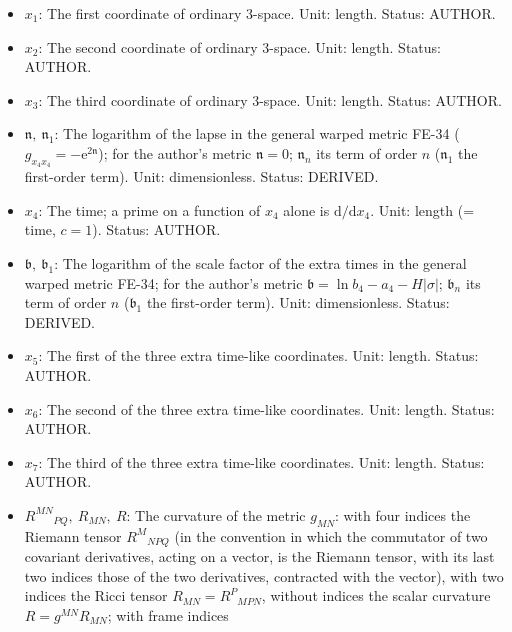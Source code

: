 \documentclass[
  10pt,
]{article}
\begin{document}
\begin{itemize}
  of ordinary space in the general warped metric FE-34, a function of
  \(\sigma\) and \(x_4\); for the author's metric
  \(\mathfrak{a} = a_4 - H\lvert\sigma\rvert\); \(\mathfrak{a}_n\) its
  term of order \(n\) in the power series FE-35 (\(\mathfrak{a}_1\) the
  first-order term). Unit: dimensionless. Status: DERIVED.
\item
  \(x_1\): The first coordinate of ordinary 3-space. Unit: length.
  Status: AUTHOR.
\item
  \(x_2\): The second coordinate of ordinary 3-space. Unit: length.
  Status: AUTHOR.
\item
  \(x_3\): The third coordinate of ordinary 3-space. Unit: length.
  Status: AUTHOR.
\item
  \(\mathfrak{n},\ \mathfrak{n}_1\): The logarithm of the lapse in the
  general warped metric FE-34
  (\(g_{x_4x_4} = -\mathrm{e}^{2\mathfrak{n}}\)); for the author's
  metric \(\mathfrak{n} = 0\); \(\mathfrak{n}_n\) its term of order
  \(n\) (\(\mathfrak{n}_1\) the first-order term). Unit: dimensionless.
  Status: DERIVED.
\item
  \(x_4\): The time; a prime on a function of \(x_4\) alone is
  \(\mathrm{d}/\mathrm{d}x_4\). Unit: length (= time, \(c = 1\)).
  Status: AUTHOR.
\item
  \(\mathfrak{b},\ \mathfrak{b}_1\): The logarithm of the scale factor
  of the extra times in the general warped metric FE-34; for the
  author's metric
  \(\mathfrak{b} = \ln b_4 - a_4 - H\lvert\sigma\rvert\);
  \(\mathfrak{b}_n\) its term of order \(n\) (\(\mathfrak{b}_1\) the
  first-order term). Unit: dimensionless. Status: DERIVED.
\item
  \(x_5\): The first of the three extra time-like coordinates. Unit:
  length. Status: AUTHOR.
\item
  \(x_6\): The second of the three extra time-like coordinates. Unit:
  length. Status: AUTHOR.
\item
  \(x_7\): The third of the three extra time-like coordinates. Unit:
  length. Status: AUTHOR.
\item
  \(R^{MN}{}_{PQ},\ R_{MN},\ R\): The curvature of the metric
  \(g_{MN}\): with four indices the Riemann tensor \(R^M{}_{NPQ}\) (in
  the convention in which the commutator of two covariant derivatives,
  acting on a vector, is the Riemann tensor, with its last two indices
  those of the two derivatives, contracted with the vector), with two
  indices the Ricci tensor \(R_{MN} = R^P{}_{MPN}\), without indices the
  scalar curvature \(R = g^{MN}R_{MN}\); with frame indices

\end{itemize}
\end{document}
